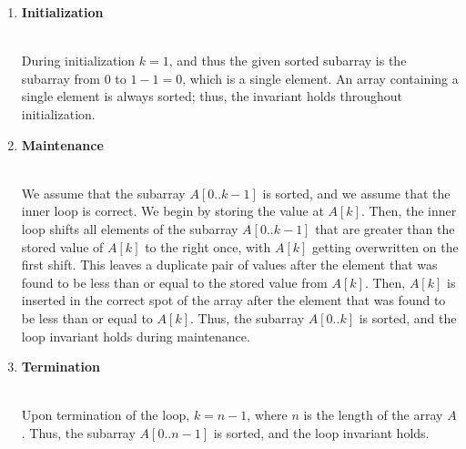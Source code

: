 \documentclass{article}
\begin{document}
\begin{enumerate}
    \item \textbf{Initialization} \\\\
    \begin{minipage}{\linewidth}
        During initialization \( k = 1 \), and thus the given sorted subarray is the subarray from \( 0 \) to \( 1-1 = 0 \), which is a single element. An array containing a single element is always sorted; thus, the invariant holds throughout initialization.\\
    \end{minipage}
    \item \textbf{Maintenance} \\\\
    \begin{minipage}{\linewidth}
        We assume that the subarray \( A[0..k-1] \) is sorted, and we assume that the inner loop is correct. We begin by storing the value at \( A[k] \). Then, the inner loop shifts all elements of the subarray \( A[0..k-1] \) that are greater than the stored value of \( A[k] \) to the right once, with \( A[k] \) getting overwritten on the first shift. This leaves a duplicate pair of values after the element that was found to be less than or equal to the stored value from \( A[k] \). Then, \( A[k] \) is inserted in the correct spot of the array after the element that was found to be less than or equal to \( A[k] \). Thus, the subarray \( A[0..k] \) is sorted, and the loop invariant holds during maintenance.\\
    \end{minipage}
    \item \textbf{Termination} \\\\
    \begin{minipage}{\linewidth}
        Upon termination of the loop, \( k = n-1 \), where \( n \) is the length of the array \( A \). Thus, the subarray \( A[0..n-1] \) is sorted, and the loop invariant holds.
    \end{minipage}
\end{enumerate}

\newpage
\end{document}

